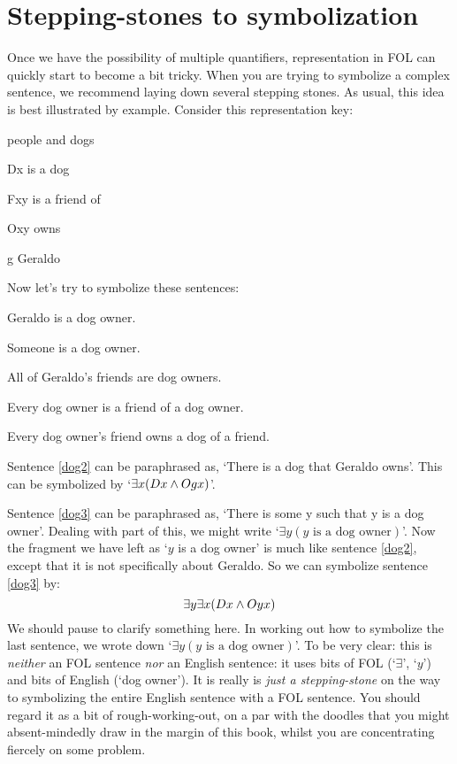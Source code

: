\section{Stepping-stones to symbolization}
Once we have the possibility of multiple quantifiers, representation in FOL can quickly start to become a bit tricky. When you are trying to symbolize a complex sentence, we recommend laying down several stepping stones. As usual, this idea is best illustrated by example. Consider this representation key:
\begin{ekey}
\item[\text{domain}] people and dogs
\item[Dx]  is a dog
\item[Fxy]  is a friend of 
\item[Oxy]  owns 
\item[g] Geraldo
\end{ekey}
Now let's try to symbolize these sentences:
\begin{earg}
\item[\ex{dog2}] Geraldo is a dog owner.
\item[\ex{dog3}] Someone is a dog owner.
\item[\ex{dog4}] All of Geraldo's friends are dog owners.
\item[\ex{dog5}] Every dog owner is a friend of a dog owner.
\item[\ex{dog6}] Every dog owner's friend owns a dog of a friend.
\end{earg}
Sentence \ref{dog2} can be paraphrased as, `There is a dog that Geraldo owns'. This can be symbolized by `$\exists x(Dx \wedge Ogx)$'.

Sentence \ref{dog3} can be paraphrased as, `There is some y such that y is a dog owner'. Dealing with part of this, we might write `$\exists y(y\text{ is a dog owner})$'. Now the fragment we have left as `$y$ is a dog owner' is much like sentence \ref{dog2}, except that it is not specifically about Geraldo. So we can symbolize sentence \ref{dog3} by:
$$\exists y \exists x(Dx \wedge Oyx)$$
We should pause to clarify something here. In working out how to symbolize the last sentence, we wrote down `$\exists y(y\text{ is a dog owner})$'. To be very clear: this is \emph{neither} an FOL sentence \emph{nor} an English sentence: it uses bits of FOL (`$\exists$', `$y$') and bits of English (`dog owner'). It is really is \emph{just a stepping-stone} on the way to symbolizing the entire English sentence with a FOL sentence. You should regard it as a bit of rough-working-out, on a par with the doodles that you might absent-mindedly draw in the margin of this book, whilst you are concentrating fiercely on some problem.  

